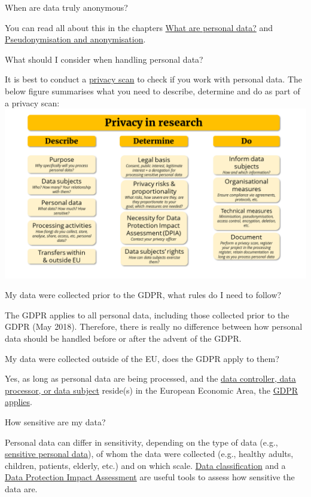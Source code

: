 \documentclass[
]{book}
\begin{document}
When are data truly anonymous?

You can read all about this in the chapters \protect\hyperlink{personal-data}{What are personal data?} and \protect\hyperlink{pseudonymisation-anonymisation}{Pseudonymisation and anonymisation}.

What should I consider when handling personal data?

It is best to conduct a \protect\hyperlink{privacy-scan}{privacy scan} to check if you work with personal data. The below figure summarises what you need to describe, determine and do as part of a privacy scan: \includegraphics{img/privacyscan_infograph.png}

My data were collected prior to the GDPR, what rules do I need to follow?

The GDPR applies to all personal data, including those collected prior to the GDPR (May 2018). Therefore, there is really no difference between how personal data should be handled before or after the advent of the GDPR.

My data were collected outside of the EU, does the GDPR apply to them?

Yes, as long as personal data are being processed, and the \protect\hyperlink{definitions}{data controller, data processor, or data subject} reside(s) in the European Economic Area, the \protect\hyperlink{gdpr-scope}{GDPR applies}.~

How sensitive are my data?

Personal data can differ in sensitivity, depending on the type of data (e.g., \protect\hyperlink{special-types-personal-data}{sensitive personal data}), of whom the data were collected (e.g., healthy adults, children, patients, elderly, etc.) and on which scale. \protect\hyperlink{data-classification}{Data classification} and a \protect\hyperlink{dpia}{Data Protection Impact Assessment} are useful tools to assess how sensitive the data are.
\end{document}
